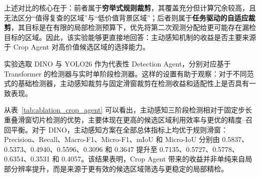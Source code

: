 上述对比的核心在于：前者属于\textbf{穷举式规则裁剪}，其覆盖充分但计算冗余较高，且无法区分“值得复查的区域”与“低价值背景区域”；后者则属于\textbf{任务驱动的自适应裁剪}，其目标是在有限的局部检测预算下，优先将第二次观测分配给更可能存在漏检目标的区域。因此，该实验能够更直接地回答：主动感知机制的收益是否主要来源于 Crop Agent 对高价值候选区域的选择能力。

实验选取 DINO 与 YOLO26 作为代表性 Detection Agent，分别对应基于 Transformer 的检测器与实时单阶段检测器。这样的设置有助于观察：对于不同范式的基础检测器，主动感知裁剪与固定滑窗裁剪在检测收益和适配性上是否具有一致表现。

\begin{table}[htbp]
    \centering
    \caption{不同候选裁剪策略下的总体检测指标对比}
    \label{tab:ablation_crop_agent}
\end{table}

从表~\ref{tab:ablation_crop_agent} 可以看出，主动感知三阶段检测相对于固定步长重叠滑窗切片检测的优势，主要体现在更高的候选区域利用效率与更优的精度--召回平衡。对于 DINO，主动感知方案在全部总体指标上均优于规则滑窗：Precision、Recall、Macro-F1、Micro-F1、mIoU 和 Micro-IoU 分别由 0.5837、0.5373、0.4940、0.5596、0.3096 和 0.3647 提升至 0.7135、0.5727、0.5778、0.6354、0.3531 和 0.4057。该结果表明，Crop Agent 带来的收益并非单纯来自局部分辨率提升，而是来源于更有效的候选区域筛选与更稳定的局部精检。

